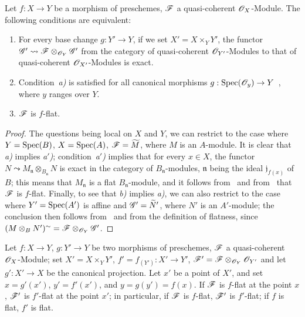 \begin{proposition}[2.1.3]
\label{IV.2.1.3}
Let $f:X\to Y$ be a morphism of preschemes, $\mathscr{F}$ a quasi-coherent $\mathscr{O}_X$-Module. The following conditions are equivalent:
\begin{enumerate}
  \item[\emph{a)}] For every base change $g:Y'\to Y$, if we set $X'=X\times_Y Y'$, the functor $\mathscr{G}'\leadsto\mathscr{F}\otimes_{\mathscr{O}_Y}\mathscr{G}'$ from the category of quasi-coherent $\mathscr{O}_{Y'}$-Modules to that of quasi-coherent $\mathscr{O}_{X'}$-Modules is exact.
  \item[\emph{a$'$)}] Condition~\emph{a)} is satisfied for all canonical morphisms $g:\operatorname{Spec}(\mathscr{O}_y)\to Y$~, where $y$ ranges over $Y$.
  \item[\emph{b)}] $\mathscr{F}$ is $f$-flat.
\end{enumerate}
\end{proposition}

\begin{proof}
The questions being local on $X$ and $Y$, we can restrict to the case where $Y=\operatorname{Spec}(B)$, $X=\operatorname{Spec}(A)$, $\mathscr{F}=\widetilde{M}$, where $M$ is an $A$-module.
It is clear that \emph{a)} implies \emph{a$'$)};
condition~\emph{a$'$)} implies that for every $x\in X$, the functor $N\leadsto M_\mathfrak{n}\otimes_{B_\mathfrak{n}}N$ is exact in the category of $B_\mathfrak{n}$-modules, $\mathfrak{n}$ being the ideal $\mathfrak{j}_{f(x)}$ of $B$; this means that $M_\mathfrak{n}$ is a flat $B_\mathfrak{n}$-module, and it follows from~ and from~ that $\mathscr{F}$ is $f$-flat.
Finally, to see that \emph{b)} implies \emph{a)}, we can also restrict to the case where $Y'=\operatorname{Spec}(A')$ is affine and $\mathscr{G}'=\widetilde{N}'$, where $N'$ is an $A'$-module; the conclusion then follows from~ and from the definition of flatness, since $(M\otimes_B N')^{\sim}=\mathscr{F}\otimes_{\mathscr{O}_Y}\mathscr{G}'$.
\end{proof}

\begin{proposition}[2.1.4]
\label{IV.2.1.4}
Let $f:X\to Y$, $g:Y'\to Y$ be two morphisms of preschemes, $\mathscr{F}$ a quasi-coherent $\mathscr{O}_X$-Module; set $X'=X\times_Y Y'$, $f'=f_{(Y')}:X'\to Y'$, $\mathscr{F}'=\mathscr{F}\otimes_{\mathscr{O}_Y}\mathscr{O}_{Y'}$ and let $g':X'\to X$ be the canonical projection.
Let $x'$ be a point of $X'$, and set $x=g'(x')$, $y'=f'(x')$, and $y=g(y')=f(x)$.
If $\mathscr{F}$ is $f$-flat at the point $x$, $\mathscr{F}'$ is $f'$-flat at the point $x'$; in particular, if $\mathscr{F}$ is $f$-flat, $\mathscr{F}'$ is $f'$-flat; if $f$ is flat, $f'$ is flat.
\end{proposition}

